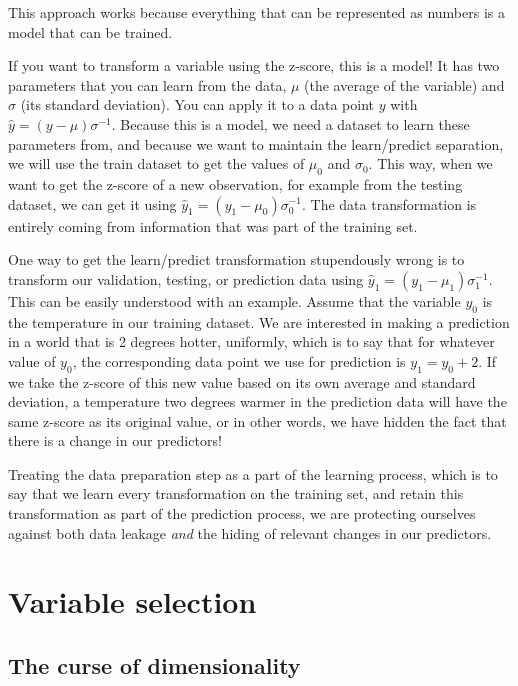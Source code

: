 \documentclass[
  letterpaper,
]{scrbook}
\begin{document}
This approach works because everything that can be represented as
numbers is a model that can be trained.

If you want to transform a variable using the z-score, this is a model!
It has two parameters that you can learn from the data, \(\mu\) (the
average of the variable) and \(\sigma\) (its standard deviation). You
can apply it to a data point \(y\) with
\(\hat y = (y - \mu)\sigma^{-1}\). Because this is a model, we need a
dataset to learn these parameters from, and because we want to maintain
the learn/predict separation, we will use the train dataset to get the
values of \(\mu_0\) and \(\sigma_0\). This way, when we want to get the
z-score of a new observation, for example from the testing dataset, we
can get it using \(\hat y_1 = (y_1 - \mu_0)\sigma_0^{-1}\). The data
transformation is entirely coming from information that was part of the
training set.

One way to get the learn/predict transformation stupendously wrong is to
transform our validation, testing, or prediction data using
\(\hat y_1 = (y_1 - \mu_1)\sigma_1^{-1}\). This can be easily understood
with an example. Assume that the variable \(y_0\) is the temperature in
our training dataset. We are interested in making a prediction in a
world that is 2 degrees hotter, uniformly, which is to say that for
whatever value of \(y_0\), the corresponding data point we use for
prediction is \(y_1 = y_0 + 2\). If we take the z-score of this new
value based on its own average and standard deviation, a temperature two
degrees warmer in the prediction data will have the same z-score as its
original value, or in other words, we have hidden the fact that there is
a change in our predictors!

Treating the data preparation step as a part of the learning process,
which is to say that we learn every transformation on the training set,
and retain this transformation as part of the prediction process, we are
protecting ourselves against both data leakage \emph{and} the hiding of
relevant changes in our predictors.

\section{Variable selection}\label{variable-selection}

\subsection{The curse of dimensionality}\label{sec-predictors-curse}
\end{document}
